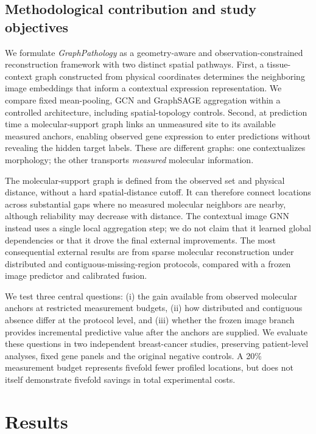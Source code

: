 \subsection{Methodological contribution and study objectives}
We formulate \emph{GraphPathology} as a geometry-aware and observation-constrained reconstruction framework with two distinct spatial pathways. First, a tissue-context graph constructed from physical coordinates determines the neighboring image embeddings that inform a contextual expression representation. We compare fixed mean-pooling, GCN\cite{kipf2017} and GraphSAGE\cite{hamilton2017} aggregation within a controlled architecture, including spatial-topology controls. Second, at prediction time a molecular-support graph links an unmeasured site to its available measured anchors, enabling observed gene expression to enter predictions without revealing the hidden target labels. These are different graphs: one contextualizes morphology; the other transports \emph{measured} molecular information.

The molecular-support graph is defined from the observed set and physical distance, without a hard spatial-distance cutoff. It can therefore connect locations across substantial gaps where no measured molecular neighbors are nearby, although reliability may decrease with distance. The contextual image GNN instead uses a single local aggregation step; we do not claim that it learned global dependencies or that it drove the final external improvements. The most consequential external results are from sparse molecular reconstruction under distributed and contiguous-missing-region protocols, compared with a frozen image predictor and calibrated fusion.

We test three central questions: (i) the gain available from observed molecular anchors at restricted measurement budgets, (ii) how distributed and contiguous absence differ at the protocol level, and (iii) whether the frozen image branch provides incremental predictive value after the anchors are supplied. We evaluate these questions in two independent breast-cancer studies, preserving patient-level analyses, fixed gene panels and the original negative controls. A 20\% measurement budget represents fivefold fewer profiled locations, but does not itself demonstrate fivefold savings in total experimental costs.

\section{Results}
